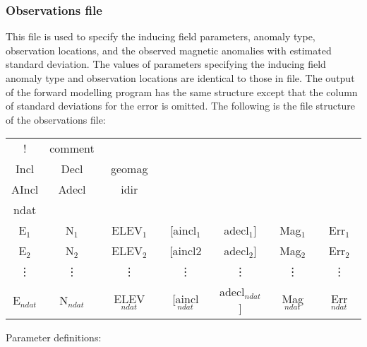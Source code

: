 \subsubsection{Observations file}
This file is used to specify the inducing field parameters, anomaly type, observation locations, and the observed magnetic anomalies with estimated standard deviation. The values of parameters specifying the inducing field anomaly type and observation locations are identical to those in  file. The output of the forward modelling program  has the same structure except that the column of standard deviations for the error is omitted. The following is the file structure of the observations file:
\begin{fileExample}
\begin{tabular}{|ccccccc|}
\hline
! & comment & & & & & \\
Incl & Decl & geomag & & & & \\
AIncl & Adecl & idir & & & & \\
ndat & & & & & & \\
E$_1$ & N$_1$ & ELEV$_1$ & [aincl$_1$ & adecl$_1$] & Mag$_1$ & Err$_1$ \\
E$_2$ & N$_2$ & ELEV$_2$ & [aincl$2$ & adecl$_2$] & Mag$_2$ & Err$_2$ \\
\vdots & \vdots & \vdots & \vdots & \vdots & \vdots & \vdots \\
E$_{ndat}$ & N$_{ndat}$ & ELEV$_{ndat}$ & [aincl$_{ndat}$ & adecl$_{ndat}$] & Mag$_{ndat}$ & Err$_{ndat}$ \\
\hline
\end{tabular}
\end{fileExample}
%
Parameter definitions:
%
